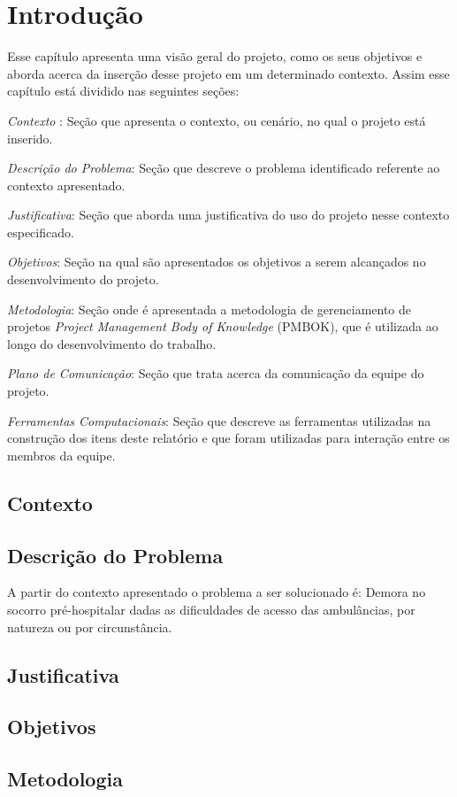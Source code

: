 \chapter[Introdução]{Introdução}\label{cap1}

Esse capítulo apresenta uma visão geral do projeto, como os seus objetivos e aborda acerca da inserção desse projeto em um determinado contexto. Assim esse capítulo está dividido nas seguintes seções:

\textit{Contexto} : Seção que apresenta o contexto, ou cenário, no qual o projeto está inserido.

\textit{Descrição do Problema}: Seção que descreve o problema identificado referente ao contexto apresentado.

\textit{Justificativa}: Seção que aborda uma justificativa do uso do projeto nesse contexto especificado.

\textit{Objetivos}: Seção na qual são apresentados os objetivos a serem alcançados no desenvolvimento do projeto.

\textit{Metodologia}: Seção onde é apresentada a metodologia de gerenciamento de projetos \textit{Project Management Body of Knowledge} (PMBOK), que é utilizada ao longo do desenvolvimento do trabalho.

\textit{Plano de Comunicação}: Seção que trata acerca da comunicação da equipe do projeto.

\textit{Ferramentas Computacionais}: Seção que descreve as ferramentas utilizadas na construção dos itens deste relatório e que foram utilizadas para interação entre os membros da equipe.


\section{Contexto}
  
\section{Descrição do Problema}
A partir do contexto apresentado o problema a ser solucionado é:
Demora no socorro pré-hospitalar dadas as dificuldades de acesso das ambulâncias, por natureza ou por circunstância.

\section{Justificativa}
  
\section{Objetivos}
  


\section{Metodologia}
   

